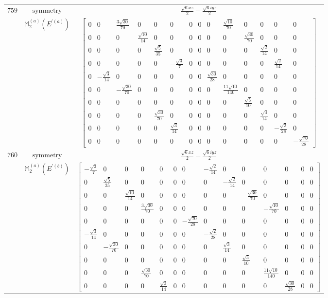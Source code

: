 \documentclass[fleqn,8pt,landscape]{jsarticle}
\begin{document}
\begin{longtable}{ccc}
$ 759 $ & $ \text{symmetry} $ & $ \frac{\sqrt{6} x z}{2} + \frac{\sqrt{6} i y z}{2} $ \\
$  $ & $ \mathbb{M}_{2}^{(a)}(E^{\prime(a)}) $ & $ \begin{bmatrix} 0 & 0 & \frac{3 \sqrt{30}}{70} & 0 & 0 & 0 & 0 & 0 & 0 & \frac{\sqrt{10}}{70} & 0 & 0 & 0 & 0 \\ 0 & 0 & 0 & \frac{\sqrt{10}}{14} & 0 & 0 & 0 & 0 & 0 & 0 & \frac{\sqrt{30}}{70} & 0 & 0 & 0 \\ 0 & 0 & 0 & 0 & \frac{\sqrt{5}}{35} & 0 & 0 & 0 & 0 & 0 & 0 & \frac{\sqrt{2}}{14} & 0 & 0 \\ 0 & 0 & 0 & 0 & 0 & - \frac{\sqrt{3}}{7} & 0 & 0 & 0 & 0 & 0 & 0 & \frac{\sqrt{2}}{14} & 0 \\ 0 & - \frac{\sqrt{3}}{14} & 0 & 0 & 0 & 0 & 0 & 0 & \frac{\sqrt{30}}{28} & 0 & 0 & 0 & 0 & 0 \\ 0 & 0 & - \frac{\sqrt{30}}{70} & 0 & 0 & 0 & 0 & 0 & 0 & \frac{11 \sqrt{10}}{140} & 0 & 0 & 0 & 0 \\ 0 & 0 & 0 & 0 & 0 & 0 & 0 & 0 & 0 & 0 & \frac{\sqrt{5}}{10} & 0 & 0 & 0 \\ 0 & 0 & 0 & 0 & \frac{\sqrt{30}}{70} & 0 & 0 & 0 & 0 & 0 & 0 & \frac{\sqrt{3}}{14} & 0 & 0 \\ 0 & 0 & 0 & 0 & 0 & \frac{\sqrt{3}}{14} & 0 & 0 & 0 & 0 & 0 & 0 & - \frac{\sqrt{2}}{28} & 0 \\ 0 & 0 & 0 & 0 & 0 & 0 & 0 & 0 & 0 & 0 & 0 & 0 & 0 & - \frac{\sqrt{70}}{28} \end{bmatrix} $ \\ \hline
$ 760 $ & $ \text{symmetry} $ & $ \frac{\sqrt{6} x z}{2} - \frac{\sqrt{6} i y z}{2} $ \\
$  $ & $ \mathbb{M}_{2}^{(a)}(E^{\prime(b)}) $ & $ \begin{bmatrix} - \frac{\sqrt{3}}{7} & 0 & 0 & 0 & 0 & 0 & 0 & - \frac{\sqrt{2}}{14} & 0 & 0 & 0 & 0 & 0 & 0 \\ 0 & \frac{\sqrt{5}}{35} & 0 & 0 & 0 & 0 & 0 & 0 & - \frac{\sqrt{2}}{14} & 0 & 0 & 0 & 0 & 0 \\ 0 & 0 & \frac{\sqrt{10}}{14} & 0 & 0 & 0 & 0 & 0 & 0 & - \frac{\sqrt{30}}{70} & 0 & 0 & 0 & 0 \\ 0 & 0 & 0 & \frac{3 \sqrt{30}}{70} & 0 & 0 & 0 & 0 & 0 & 0 & - \frac{\sqrt{10}}{70} & 0 & 0 & 0 \\ 0 & 0 & 0 & 0 & 0 & 0 & - \frac{\sqrt{70}}{28} & 0 & 0 & 0 & 0 & 0 & 0 & 0 \\ - \frac{\sqrt{3}}{14} & 0 & 0 & 0 & 0 & 0 & 0 & - \frac{\sqrt{2}}{28} & 0 & 0 & 0 & 0 & 0 & 0 \\ 0 & - \frac{\sqrt{30}}{70} & 0 & 0 & 0 & 0 & 0 & 0 & \frac{\sqrt{3}}{14} & 0 & 0 & 0 & 0 & 0 \\ 0 & 0 & 0 & 0 & 0 & 0 & 0 & 0 & 0 & \frac{\sqrt{5}}{10} & 0 & 0 & 0 & 0 \\ 0 & 0 & 0 & \frac{\sqrt{30}}{70} & 0 & 0 & 0 & 0 & 0 & 0 & \frac{11 \sqrt{10}}{140} & 0 & 0 & 0 \\ 0 & 0 & 0 & 0 & \frac{\sqrt{3}}{14} & 0 & 0 & 0 & 0 & 0 & 0 & \frac{\sqrt{30}}{28} & 0 & 0 \end{bmatrix} $ \\ \hline

\end{longtable}
\end{document}
